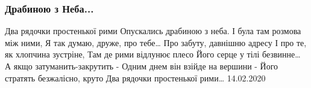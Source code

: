  
 
 

\subsubsection{Драбиною з Неба...}
\label{sec:poetry.rus.mykola_dudar_1950.drabynoju_z_neba}

Два рядочки простенької рими
Опускались драбиною з неба.
І була там розмова між ними,
Я так думаю, друже, про тебе…
Про забуту, давнішню адресу
І про те, як хлопчина зустріне,
Там де рими відлунює плесо
Його серце у тілі безвинне…
А якщо затуманить-закрутить -
Одним днем він взійде на вершини -
Його стратять безжалісно, круто
Два рядочки простенької рими…
14.02.2020 
